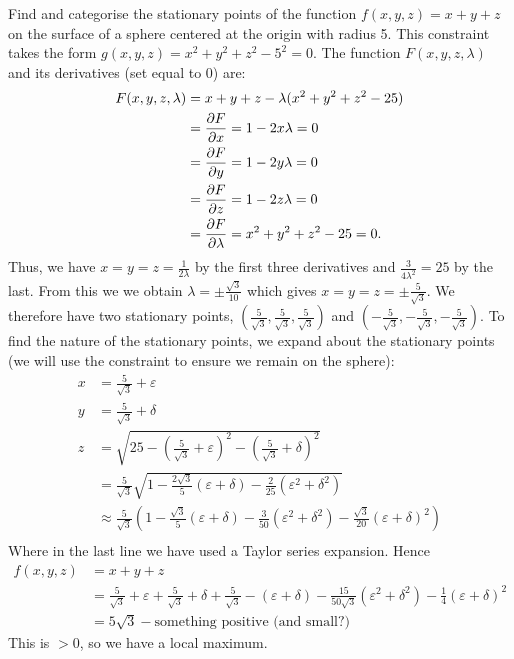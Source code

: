 \documentclass[../multivariate_calculus.tex]{subfiles}
\begin{document}
        \begin{example}
            Find and categorise the stationary points of the function $f(x,y,z)=x+y+z$ on the surface of a sphere centered at the origin with radius 5.
            This constraint takes the form $g(x,y,z)=x^2+y^2+z^2-5^2=0$.
            The function $F(x,y,z,\lambda)$ and its derivatives (set equal to 0) are:
            \begin{align}
                F(x,y,z,\lambda)&=x+y+z-\lambda(x^2+y^2+z^2-25)\\
                &=\frac{\partial F}{\partial x}=1-2x\lambda=0\\
                &=\frac{\partial F}{\partial y}=1-2y\lambda=0\\
                &=\frac{\partial F}{\partial z}=1-2z\lambda=0\\
                &=\frac{\partial F}{\partial\lambda}=x^2+y^2+z^2-25=0.
            \end{align}
            Thus, we have $x=y=z=\frac{1}{2\lambda}$ by the first three derivatives and $\frac{3}{4\lambda^2}=25$ by the last.
            From this we we obtain $\lambda=\pm\frac{\sqrt{3}}{10}$ which gives $x=y=z=\pm\frac{5}{\sqrt{3}}$.
            We therefore have two stationary points, $(\frac{5}{\sqrt{3}},\frac{5}{\sqrt{3}},\frac{5}{\sqrt{3}})$ and $(-\frac{5}{\sqrt{3}},-\frac{5}{\sqrt{3}},-\frac{5}{\sqrt{3}})$.
            To find the nature of the stationary points, we expand about the stationary points (we will use the constraint to ensure we remain on the sphere):
            \begin{align}
                x&=\frac{5}{\sqrt{3}}+\varepsilon\\
                y&=\frac{5}{\sqrt{3}}+\delta\\
                z&=\sqrt{25-\left(\frac{5}{\sqrt{3}}+\varepsilon\right)^2-\left(\frac{5}{\sqrt{3}}+\delta\right)^2}\\
                &=\frac{5}{\sqrt{3}}\sqrt{1-\frac{2\sqrt{3}}{5}(\varepsilon+\delta)-\frac{2}{25}(\varepsilon^2+\delta^2)}\\
                &\approx\frac{5}{\sqrt{3}}(1-\frac{\sqrt{3}}{5}(\varepsilon+\delta)-\frac{3}{50}(\varepsilon^2+\delta^2)-\frac{\sqrt{3}}{20}(\varepsilon+\delta)^2)\\
            \end{align}
            Where in the last line we have used a Taylor series expansion.
            Hence
            \begin{align}
                f(x,y,z)&=x+y+z\\
                &=\frac{5}{\sqrt{3}}+\varepsilon+\frac{5}{\sqrt{3}}+\delta+\frac{5}{\sqrt{3}}-(\varepsilon+\delta)-\frac{15}{50\sqrt{3}}(\varepsilon^2+\delta^2)-\frac{1}{4}(\varepsilon+\delta)^2\\
                &=5\sqrt{3}-\text{something positive (and small?)}
            \end{align}
            This is $>0$, so we have a local maximum.
        \end{example}
\end{document}
